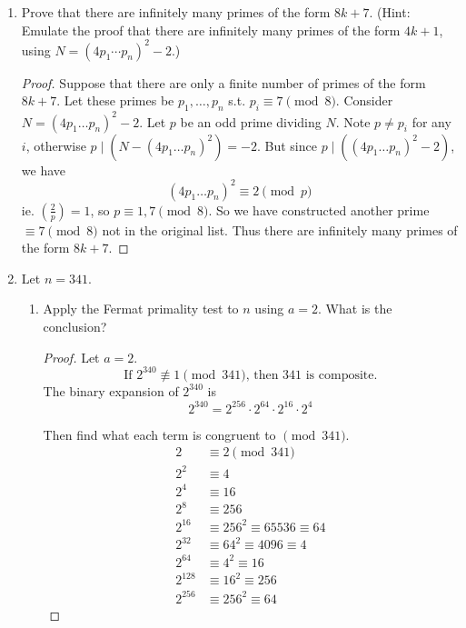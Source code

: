 \documentclass[11pt]{article}
\theoremstyle{definition}
\newcommand{\legendre}[2]{\ensuremath{\left( \frac{#1}{#2} \right) }}
\begin{document}
\begin{enumerate}
    \item Prove that there are infinitely many primes of the form $8k+7$. (Hint: Emulate the proof that there are infinitely many primes of the form $4k+1$, using $N = (4p_1\cdots p_n)^2 - 2$.)
    \begin{proof}
        Suppose that there are only a finite number of primes of the form 
        $8k+7$. Let these primes be $p_1,\dots,p_n$ s.t. $p_i\equiv 7\pmod{8}$.
        Consider $N = (4p_1\dots p_n)^2 - 2$.
        Let $p$ be an odd prime dividing $N$. Note $p\ne p_i$ for any $i$, otherwise 
        $p\mid (N-(4p_1\dots p_n)^2) = -2$. 
        But since $p\mid ((4p_1\dots p_n)^2 - 2)$, we have
        \[
            (4p_1\dots p_n)^2 \equiv 2 \pmod{p}
        \]
        ie. $\legendre{2}{p} = 1$, so $p\equiv 1,7\pmod{8}$. 
        So we have constructed another prime $\equiv 7\pmod{8}$ not in the original list. 
        Thus there are infinitely many primes of the form $8k+7$.

    \end{proof}

    \item Let $n=341$.
    \begin{enumerate}
        \item Apply the Fermat primality test to $n$ using $a=2$. What is the conclusion?
        \begin{proof}
            Let $a=2$. 
            \[
                \text{If } 2^{340}\not\equiv 1 \pmod{341} \text{, then 341 is composite.}
            \]
            The binary expansion of $2^{340}$ is 
            \[
                2^{340} = 2^{256}\cdot 2^{64}\cdot 2^{16}\cdot 2^{4}
            \]

            Then find what each term is congruent to $\pmod{341}$.
            \begin{align*}
                2   &\equiv 2 \pmod{341} \\
                2^2 &\equiv 4 \\
                2^4 &\equiv 16 \\
                2^8 &\equiv 256 \\
                2^{16} &\equiv 256^2 \equiv 65536 \equiv 64  \\
                2^{32} &\equiv 64^2 \equiv 4096 \equiv 4 \\
                2^{64}  &\equiv 4^2\equiv 16 \\
                2^{128} &\equiv 16^2\equiv 256 \\
                2^{256}  &\equiv 256^2\equiv 64
            \end{align*}


\end{proof}
\end{enumerate}
\end{enumerate}
\end{document}
